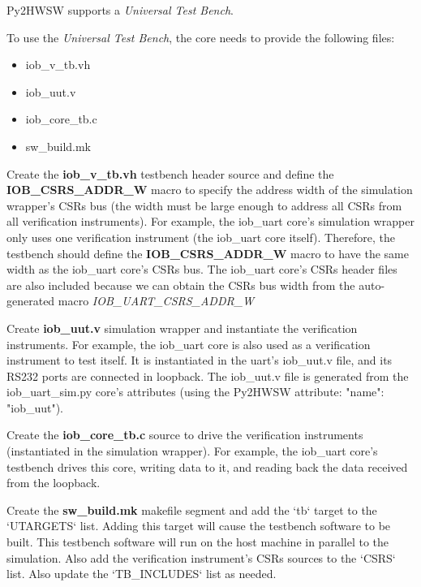 %

Py2HWSW supports a \textit{Universal Test Bench}.

To use the \textit{Universal Test Bench}, the core needs to provide the following files:
\begin{itemize}
  \item iob\_v\_tb.vh
  \item iob\_uut.v
  \item iob\_core\_tb.c
  \item sw\_build.mk
\end{itemize}


Create the \textbf{iob\_v\_tb.vh} testbench header source and define the \textbf{IOB\_CSRS\_ADDR\_W} macro to specify the address width of the simulation wrapper's CSRs bus (the width must be large enough to address all CSRs from all verification instruments).
For example, the iob\_uart core's simulation wrapper only uses one verification instrument (the iob\_uart core itself). Therefore, the testbench should define the \textbf{IOB\_CSRS\_ADDR\_W} macro to have the same width as the iob\_uart core's CSRs bus.
The iob\_uart core's CSRs header files are also included because we can obtain the CSRs bus width from the auto-generated macro \textit{IOB\_UART\_CSRS\_ADDR\_W}


Create \textbf{iob\_uut.v} simulation wrapper and instantiate the verification instruments.
For example, the iob\_uart core is also used as a verification instrument to test itself. It is instantiated in the uart's iob\_uut.v file, and its RS232 ports are connected in loopback. The iob\_uut.v file is generated from the iob\_uart\_sim.py core's attributes (using the Py2HWSW attribute: "name": "iob\_uut").


Create the \textbf{iob\_core\_tb.c} source to drive the verification instruments (instantiated in the simulation wrapper).
For example, the iob\_uart core's testbench drives this core, writing data to it, and reading back the data received from the loopback.

Create the \textbf{sw\_build.mk} makefile segment and add the `tb` target to the `UTARGETS` list. Adding this target will cause the testbench software to be built. This testbench software will run on the host machine in parallel to the simulation.
Also add the verification instrument's CSRs sources to the `CSRS` list.
Also update the `TB\_INCLUDES` list as needed.
